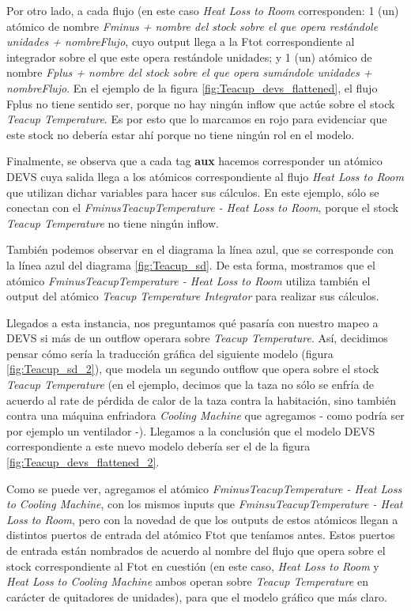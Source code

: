 Por otro lado, a cada flujo (en este caso \textit{Heat Loss to Room} corresponden: 1 (un) atómico de nombre \textit{Fminus + nombre del stock sobre el que opera restándole unidades + nombreFlujo}, cuyo output llega a la Ftot correspondiente al integrador sobre el que este opera restándole unidades; y 1 (un) atómico de nombre \textit{Fplus + nombre del stock sobre el que opera sumándole unidades + nombreFlujo}. En el ejemplo de la figura \ref{fig:Teacup_devs_flattened}, el flujo Fplus no tiene sentido ser, porque no hay ningún inflow que actúe sobre el stock \textit{Teacup Temperature}. Es por esto que lo marcamos en rojo para evidenciar que este stock no debería estar ahí porque no tiene ningún rol en el modelo. 

Finalmente, se observa que a cada tag \textbf{aux} hacemos corresponder un atómico DEVS cuya salida llega a los atómicos correspondiente al flujo \textit{Heat Loss to Room} que utilizan dichar variables para hacer sus cálculos. En este ejemplo, sólo se conectan con el \textit{FminusTeacupTemperature - Heat Loss to Room}, porque el stock \textit{Teacup Temperature} no tiene ningún inflow. 

También podemos observar en el diagrama la línea azul, que se corresponde con la línea azul del diagrama \ref{fig:Teacup_sd}. De esta forma, mostramos que el atómico \textit{FminusTeacupTemperature - Heat Loss to Room} utiliza también el output del atómico \textit{Teacup Temperature Integrator} para realizar sus cálculos. 

Llegados a esta instancia, nos preguntamos qué pasaría con nuestro mapeo a DEVS si más de un outflow operara sobre \textit{Teacup Temperature}. Así, decidimos pensar cómo sería la traducción gráfica del siguiente modelo (figura \ref{fig:Teacup_sd_2}), que modela un segundo outflow que opera sobre el stock \textit{Teacup Temperature} (en el ejemplo, decimos que la taza no sólo se enfría de acuerdo al rate de pérdida de calor de la taza contra la habitación, sino también contra una máquina enfriadora \textit{Cooling Machine} que agregamos - como podría ser por ejemplo un ventilador -). Llegamos a la conclusión que el modelo DEVS correspondiente a este nuevo modelo debería ser el de la figura \ref{fig:Teacup_devs_flattened_2}. 

Como se puede ver, agregamos el atómico \textit{FminusTeacupTemperature - Heat Loss to Cooling Machine}, con los mismos inputs que \textit{FminsuTeacupTemperature - Heat Loss to Room}, pero con la novedad de que los outputs de estos atómicos llegan a distintos puertos de entrada del atómico Ftot que teníamos antes. Estos puertos de entrada están nombrados de acuerdo al nombre del flujo que opera sobre el stock correspondiente al Ftot en cuestión (en este caso, \textit{Heat Loss to Room} y \textit{Heat Loss to Cooling Machine} ambos operan sobre \textit{Teacup Temperature} en carácter de quitadores de unidades), para que el modelo gráfico que más claro.

